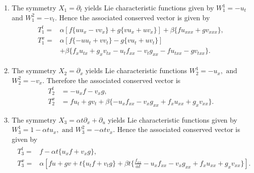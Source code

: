 \begin{enumerate} 
\item The symmetry $ X_1 = \partial_t$ yields Lie characteristic functions given by  $	W_1^1 =-u_t$ and \newline $W_1^2 =-v_t.$ Hence the  associated conserved vector is given by \begin{align} \begin{aligned}
T_1^t=& \alpha \left[f \{ u u_x- v v_x \} + g \{v u_x + u v_x \}  \right]    + \beta  \{ f u_{xxx}+ gv_{xxx} \} ,\\
T_1^x=&  \alpha \left[ f \{-  uu_t+vv_t \} - g\{ v u_t+uv_t\}\right]  \\& +  \beta \{ f_x u_{tx} + g_x v_{tx} - u_t f_{xx} -v_t g_{xx} - fu_{txx} - gv_{txx}\}. \end{aligned}\end{align}
\item The symmetry $ X_2 = \partial_x$ yields Lie characteristic functions  $
W_2^1 =-u_x, \,\, \text{and}$ $  W_2^2 =-v_x$. Therefore the associated conserved vector is
\begin{align}
T_2^t&=- u_x f - v_xg,\\
 T_2^x&= fu_t + gv_t + \beta\{  -u_xf_{xx} -v_x g_{xx} + f_{x}u_{xx} + g_{x} v_{xx}\}. 
\end{align}
\item The symmetry $ X_3=  \alpha t \partial_x+  \partial_u$ yields Lie characteristic functions given by \newline$W_3^1 =1-\alpha t u_x, \,\, \text{and} \,\, W_3^2 =-\alpha tv_x.$
Hence the associated  conserved vector is given by \begin{align} \begin{aligned}
T_3^t= &f- \alpha t \{  u_x f +  v_x g\},\\
T_3^x=& \alpha \left[ fu+gv+ t\{ u_tf+v_tg\} + \beta t\{ \frac{f_{xx}}{ \alpha t} -u_xf_{xx} -v_x g_{xx} + f_x u_{xx} + g_x v_{xx}    \}\right]. \end{aligned}
\end{align}


\end{enumerate}
